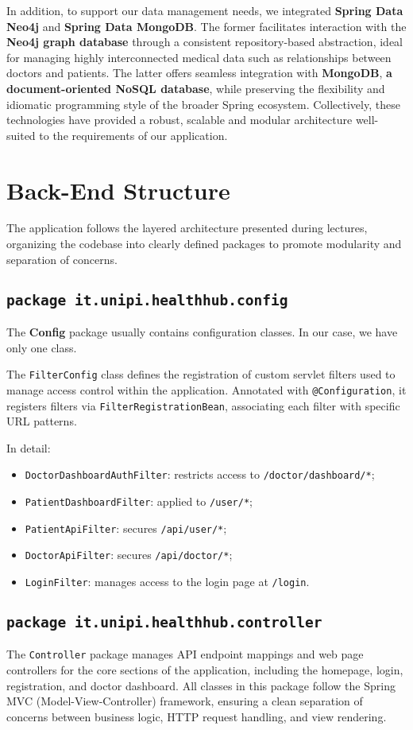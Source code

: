 In addition, to support our data management needs, we integrated \textbf{Spring Data Neo4j} and \textbf{Spring Data MongoDB}. The former facilitates interaction with the \textbf{Neo4j graph database} through a consistent repository-based abstraction, ideal for managing highly interconnected medical data such as relationships between doctors and patients. The latter offers seamless integration with \textbf{MongoDB}, \textbf{a document-oriented NoSQL database}, while preserving the flexibility and idiomatic programming style of the broader Spring ecosystem. Collectively, these technologies have provided a robust, scalable and modular architecture well-suited to the requirements of our application. 

\section{Back-End Structure}
The application follows the layered architecture presented during lectures, organizing the codebase into clearly defined packages to promote modularity and separation of concerns. 


\subsection{\texttt{package it.unipi.healthhub.config}}
The \textbf{Config} package usually contains configuration classes. In our case, we have only one class. 

The \texttt{FilterConfig} class defines the registration of custom servlet filters used to manage access control within the application. Annotated with \texttt{@Configuration}, it registers filters via \texttt{FilterRegistrationBean}, associating each filter with specific URL patterns. 

In detail:
\begin{itemize}
	\item \texttt{DoctorDashboardAuthFilter}: restricts access to \texttt{/doctor/dashboard/*};
	\item \texttt{PatientDashboardFilter}: applied to \texttt{/user/*};
	\item \texttt{PatientApiFilter}: secures \texttt{/api/user/*};
	\item \texttt{DoctorApiFilter}: secures \texttt{/api/doctor/*};
	\item \texttt{LoginFilter}: manages access to the login page at \texttt{/login}.
\end{itemize}

\subsection{\texttt{package it.unipi.healthhub.controller}}
The \texttt{Controller} package manages API endpoint mappings and web page controllers for the core sections of the application, including the homepage, login, registration, and doctor dashboard. All classes in this package follow the Spring MVC (Model-View-Controller) framework, ensuring a clean separation of concerns between business logic, HTTP request handling, and view rendering.

